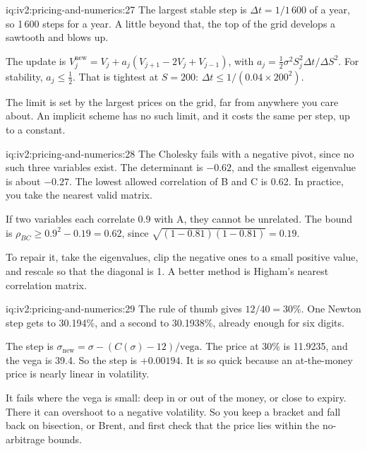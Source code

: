 \begin{solution}{iq:iv2:pricing-and-numerics:27}
The largest stable step is $\Delta t = 1/1\,600$ of a year, so 1\,600 steps for a year. A little beyond that, the top of the grid develops a sawtooth and blows up.

The update is $V_j^{\text{new}} = V_j + a_j(V_{j+1} - 2V_j + V_{j-1})$, with $a_j = \tfrac12\sigma^2S_j^2\Delta t/\Delta S^2$. For stability, $a_j \leq \tfrac12$. That is tightest at $S = 200$: $\Delta t \leq 1/(0.04 \times 200^2)$.

The limit is set by the largest prices on the grid, far from anywhere you care about. An implicit scheme has no such limit, and it costs the same per step, up to a constant.

\end{solution}

\begin{solution}{iq:iv2:pricing-and-numerics:28}
The Cholesky fails with a negative pivot, since no such three variables exist. The determinant is $-0.62$, and the smallest eigenvalue is about $-0.27$. The lowest allowed correlation of B and C is 0.62. In practice, you take the nearest valid matrix.

If two variables each correlate 0.9 with A, they cannot be unrelated. The bound is $\rho_{BC} \geq 0.9^2 - 0.19 = 0.62$, since $\sqrt{(1 - 0.81)(1 - 0.81)} = 0.19$.

To repair it, take the eigenvalues, clip the negative ones to a small positive value, and rescale so that the diagonal is 1. A better method is Higham's nearest correlation matrix.

\end{solution}

\begin{solution}{iq:iv2:pricing-and-numerics:29}
The rule of thumb gives $12/40 = 30\%$. One Newton step gets to 30.194\%, and a second to 30.1938\%, already enough for six digits.

The step is $\sigma_{\text{new}} = \sigma - (C(\sigma) - 12)/\text{vega}$. The price at 30\% is 11.9235, and the vega is 39.4. So the step is $+0.00194$. It is so quick because an at-the-money price is nearly linear in volatility.

It fails where the vega is small: deep in or out of the money, or close to expiry. There it can overshoot to a negative volatility. So you keep a bracket and fall back on bisection, or Brent, and first check that the price lies within the no-arbitrage bounds.

\end{solution}

